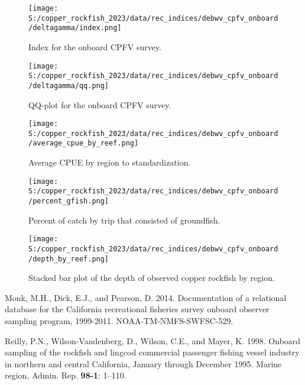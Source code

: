 \documentclass[11pt,
  english,
  letterpaper,
]{article}
\newlength{\cslhangindent}
\newenvironment{CSLReferences}[2] %
 {%
  \setlength{\parindent}{0pt}
  \ifodd #1 \everypar{\setlength{\hangindent}{\cslhangindent}}\ignorespaces\fi
  \ifnum #2 > 0
  \setlength{\parskip}{#2\baselineskip}
  \fi
 }%
 {}
\begin{document}
\newpage

\begin{figure}
\centering
\texttt{[image: S:/copper\_rockfish\_2023/data/rec\_indices/debwv\_cpfv\_onboard/deltagamma/index.png]}
\caption{Index for the onboard CPFV survey.\label{fig:deb-index}}
\end{figure}

\newpage

\begin{figure}
\centering
\texttt{[image: S:/copper\_rockfish\_2023/data/rec\_indices/debwv\_cpfv\_onboard/deltagamma/qq.png]}
\caption{QQ-plot for the onboard CPFV survey.\label{fig:deb-qq}}
\end{figure}

\newpage

\begin{figure}
\centering
\texttt{[image: S:/copper\_rockfish\_2023/data/rec\_indices/debwv\_cpfv\_onboard/average\_cpue\_by\_reef.png]}
\caption{Average CPUE by region to standardization.\label{fig:deb-regioncpue}}
\end{figure}

\newpage

\begin{figure}
\centering
\texttt{[image: S:/copper\_rockfish\_2023/data/rec\_indices/debwv\_cpfv\_onboard/percent\_gfish.png]}
\caption{Percent of catch by trip that consisted of groundfish.\label{fig:deb-percent-gfish}}
\end{figure}

\newpage

\begin{figure}
\centering
\texttt{[image: S:/copper\_rockfish\_2023/data/rec\_indices/debwv\_cpfv\_onboard/depth\_by\_reef.png]}
\caption{Stacked bar plot of the depth of observed copper rockfish by region.\label{fig:deb-depths}}
\end{figure}

\newpage

\hypertarget{refs}{}
\begin{CSLReferences}{1}{0}
\leavevmode{}%
Monk, M.H., Dick, E.J., and Pearson, D. 2014. Documentation of a relational database for the {California} recreational fisheries survey onboard observer sampling program, 1999-2011. NOAA-TM-NMFS-SWFSC-529.

\leavevmode{}%
Reilly, P.N., Wilson-Vandenberg, D., Wilson, C.E., and Mayer, K. 1998. Onboard sampling of the rockfish and lingcod commercial passenger fishing vessel industry in northern and central {California}, {January} through {December} 1995. Marine region, Admin. Rep. \textbf{98-1}: 1--110.

\end{CSLReferences}
\end{document}
